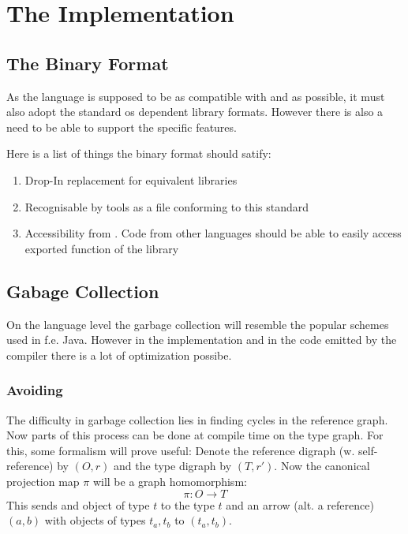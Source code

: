 
\section{The Implementation}

\subsection{The Binary Format}

As the language is supposed to be as compatible with {\clang} and {\cpplang} as possible, it must also adopt the standard os dependent library formats. However there is also a need to be able to support the {\bertlang} specific features.

\medskip

Here is a list of things the binary format should satify:
\begin{enumerate}
	\item Drop-In replacement for equivalent {\clang} libraries
	\item Recognisable by tools as a file conforming to this standard
	\item Accessibility from {\clang}. Code from other languages should be able to easily access exported function of the library
\end{enumerate}

\subsection{Gabage Collection}

On the language level the garbage collection will resemble the popular \mas schemes used in f.e. Java. However in the implementation and in the code emitted by the compiler there is a lot of optimization possibe.

\subsubsection{Avoiding \mas}

The difficulty in garbage collection lies in finding cycles in the reference graph. Now parts of this process can be done at compile time on the type graph. For this, some formalism will prove useful: Denote the reference digraph (w. self-reference) by $(O,r)$ and the type digraph by $(T, r')$. Now the canonical projection map $π$ will be a graph homomorphism:
\begin{equation*}
	π: O → T
\end{equation*}
This sends and object of type $t$ to the type $t$ and an arrow (alt. a reference) $(a,b)$ with objects of types $t_a,t_b$ to $(t_a, t_b)$.

